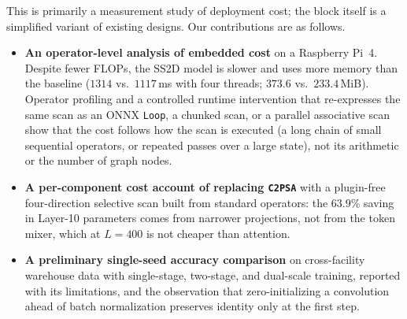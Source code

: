 This is primarily a measurement study of deployment cost; the block itself is a simplified variant of existing designs. Our contributions are as follows.
\begin{itemize}
    \item \textbf{An operator-level analysis of embedded cost} on a Raspberry Pi~4. Despite fewer FLOPs, the SS2D model is slower and uses more memory than the baseline ($1314$ vs.\ $1117$\,ms with four threads; $373.6$ vs.\ $233.4$\,MiB). Operator profiling and a controlled runtime intervention that re-expresses the same scan as an ONNX \texttt{Loop}, a chunked scan, or a parallel associative scan show that the cost follows how the scan is executed (a long chain of small sequential operators, or repeated passes over a large state), not its arithmetic or the number of graph nodes.
    \item \textbf{A per-component cost account of replacing \texttt{C2PSA}} with a plugin-free four-direction selective scan built from standard operators: the $63.9\%$ saving in Layer-10 parameters comes from narrower projections, not from the token mixer, which at $L = 400$ is not cheaper than attention.
    \item \textbf{A preliminary single-seed accuracy comparison} on cross-facility warehouse data with single-stage, two-stage, and dual-scale training, reported with its limitations, and the observation that zero-initializing a convolution ahead of batch normalization preserves identity only at the first step.
\end{itemize}
